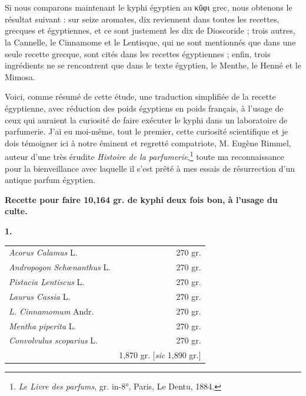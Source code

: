 \documentclass[a4paper, 11pt, oneside, landscape]{article}
\begin{document}
\section{}
\paragraph{}
Si nous comparons maintenant le kyphi égyptien au κῦφι grec, nous obtenons le résultat suivant : sur seize aromates, dix reviennent dans toutes les recettes, grecques et égyptiennes, et ce sont justement les dix de Dioscoride ; trois autres, la Cannelle, le Cinnamome et le Lentisque, qui ne sont mentionnés que dans une seule recette grecque, sont cités dans les recettes égyptiennes ; enfin, trois ingrédients ne se rencontrent que dans le texte égyptien, le Menthe, le Henné et le Mimosa.

Voici, comme résumé de cette étude, une traduction simplifiée de la recette égyptienne, avec réduction des poids égyptiens en poids français, à l'usage de ceux qui auraient la curiosité de faire exécuter le kyphi dans un laboratoire de parfumerie. J'ai eu moi-même, tout le premier, cette curiosité scientifique et je dois témoigner ici à notre éminent et regretté compatriote, M. Eugène Rimmel, auteur d'une très érudite \emph{Histoire de la parfumerie},\footnote{\emph{Le Livre des parfums}, gr. in-8°, Paris, Le Dentu, 1884.} toute ma reconnaissance pour la bienveillance avec laquelle il s'est prêté à mes essais de résurrection d'un antique parfum égyptien.
\clearpage
\begin{center}
\textbf{Recette pour faire 10,164 gr. de kyphi deux fois bon, à l'usage du culte.}
\end{center}
\begin{center}
\textbf{1.}
\end{center}
\begin{table}[H]
    \centering\bfseries
    \begin{tabular}{l r}
        \emph{Acorus Calamus} L.  &  270 gr. \\
        \emph{Andropogon Schœnanthus} L.  &  270 gr. \\
        \emph{Pistacia Lentiscus} L.  &  270 gr. \\
        \emph{Laurus Cassia} L.  &  270 gr. \\
        \emph{L. Cinnamomum} Andr.  &  270 gr. \\
        \emph{Mentha piperita} L.  &  270 gr. \\
        \emph{Convolvulus scoparius} L.  &  270 gr. \\ \hline
        ~ & 1,870 gr. [\emph{sic} 1,890 gr.] \\
    \end{tabular}
\end{table}
\end{document}
